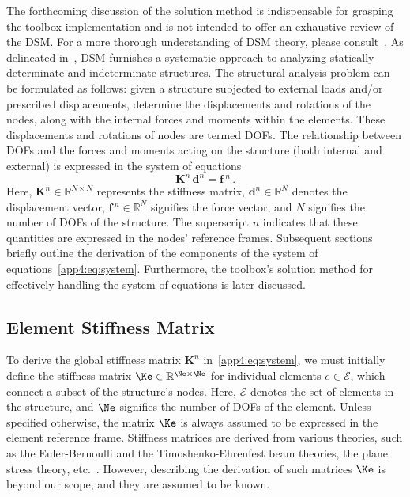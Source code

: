 The forthcoming discussion of the solution method is indispensable for grasping the toolbox implementation and is not intended to offer an exhaustive review of the \ac{DSM}. For a more thorough understanding of \ac{DSM} theory, please consult~\cite{turner1959direct, turner1964further, logan2002first, hutton2004fundamentals}. As delineated in~\cite{samuelsson2006history}, \ac{DSM} furnishes a systematic approach to analyzing statically determinate and indeterminate structures. The structural analysis problem can be formulated as follows: given a structure subjected to external loads and/or prescribed displacements, determine the displacements and rotations of the nodes, along with the internal forces and moments within the elements. These displacements and rotations of nodes are termed \acp{DOF}. The relationship between \acp{DOF} and the forces and moments acting on the structure (both internal and external) is expressed in the system of equations
%
\begin{equation}
  \label{app4:eq:system}
  \mathbf{K}^{n} \, \mathbf{d}^{n} = \mathbf{f}{\,}^{n} \, \text{.}
\end{equation}
%
Here, $\mathbf{K}^{n} \in \mathbb{R}^{N \times N}$ represents the stiffness matrix, $\mathbf{d}^{n} \in \mathbb{R}^{N}$ denotes the displacement vector, $\mathbf{f}{\,}^{n} \in \mathbb{R}^{N}$ signifies the force vector, and $N$ signifies the number of \acp{DOF} of the structure. The superscript $n$ indicates that these quantities are expressed in the nodes' reference frames. Subsequent sections briefly outline the derivation of the components of the system of equations~\eqref{app4:eq:system}. Furthermore, the toolbox's solution method for effectively handling the system of equations is later discussed.

\subsection{Element Stiffness Matrix}

To derive the global stiffness matrix $\mathbf{K}^{n}$ in~\eqref{app4:eq:system}, we must initially define the stiffness matrix $\Ke \in \mathbb{R}^{\Ne \times \Ne}$ for individual elements $e \in \mathcal{E}$, which connect a subset of the structure's nodes. Here, $\mathcal{E}$ denotes the set of elements in the structure, and $\Ne$ signifies the number of \acp{DOF} of the element. Unless specified otherwise, the matrix $\Ke$ is always assumed to be expressed in the element reference frame. Stiffness matrices are derived from various theories, such as the Euler-Bernoulli and the Timoshenko-Ehrenfest beam theories, the plane stress theory, etc.~\cite{hutton2004fundamentals}. However, describing the derivation of such matrices $\Ke$ is beyond our scope, and they are assumed to be known.

